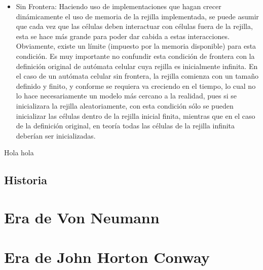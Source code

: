 \begin{itemize}
 \item Sin Frontera: Haciendo uso de implementaciones que hagan crecer dinámicamente el uso de memoria de la rejilla implementada, se puede asumir que cada vez que las células deben interactuar con células fuera de la rejilla, esta se hace más grande para poder dar cabida a estas interacciones. Obviamente, existe un límite (impuesto por la memoria disponible) para esta condición. Es muy importante no confundir esta condición de frontera con la definición original de autómata celular cuya rejilla es inicialmente infinita. En el caso de un autómata celular sin frontera, la rejilla comienza con un tamaño definido y finito, y conforme se requiera va creciendo en el tiempo, lo cual no lo hace necesariamente un modelo más cercano a la realidad, pues si se inicializara la rejilla aleatoriamente, con esta condición sólo se pueden inicializar las células dentro de la rejilla inicial finita, mientras que en el caso de la definición original, en teoría todas las células de la rejilla infinita deberían ser inicializadas.
\end{itemize}






Hola \cite{Teoria_von_neumann} hola
\subsection{Historia}



\section{Era de Von Neumann} %


\section{Era de John Horton Conway} %




